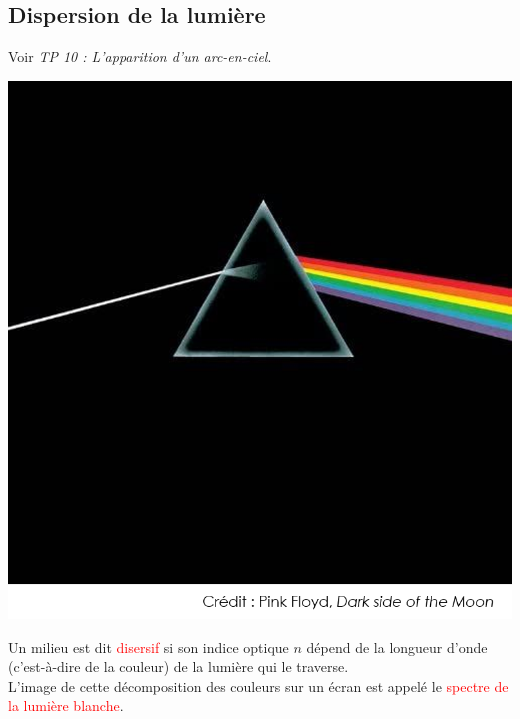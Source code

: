 \subsection{Dispersion de la lumière}
\begin{Large}
\end{Large}
Voir \textit{TP 10 : L'apparition d'un arc-en-ciel}.
\begin{multicols}{2}
    \begin{center}
        \includegraphics[scale=0.5]{Images/Cours/Chapitre_4/Pink_floyd.png}
    \end{center}
    
    \begin{tcolorbox}[colback=green!5!white,colframe=green!75!black,title=\textbf{Milieu dispersif et spectre:}, upperbox=invisible]
Un milieu est dit \textcolor{red}{disersif} si son indice optique $n$ dépend de la longueur d'onde (c'est-à-dire de la couleur) de la lumière qui le traverse.\\

L'image de cette décomposition des couleurs sur un écran est appelé le \textcolor{red}{spectre de la lumière blanche}.
\end{tcolorbox}
\end{multicols}

